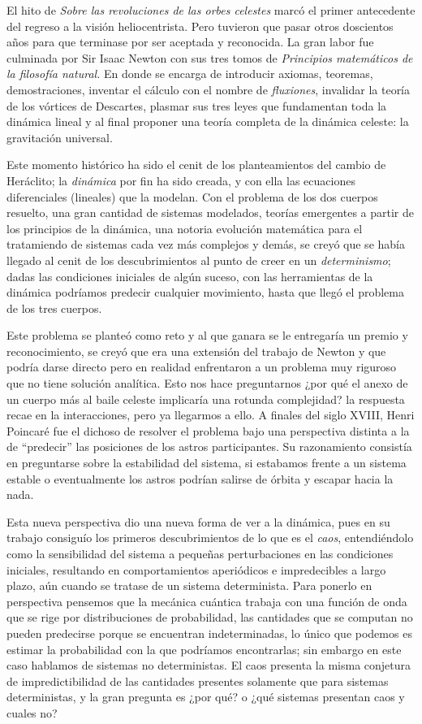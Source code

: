 \documentclass[11pt,a4paper]{article}
\begin{document}
El hito de \emph{Sobre las revoluciones de las orbes celestes} marcó el primer antecedente del regreso a la visión heliocentrista. Pero tuvieron que pasar otros doscientos años para que terminase por ser aceptada y reconocida. La gran labor fue culminada por Sir Isaac Newton con sus tres tomos de \emph{Principios matemáticos de la filosofía natural.} En donde se encarga de introducir axiomas, teoremas, demostraciones, inventar el cálculo con el nombre de \emph{fluxiones}, invalidar la teoría de los vórtices de Descartes, plasmar sus tres leyes que fundamentan toda la dinámica lineal y al final proponer una teoría completa de la dinámica celeste: la gravitación universal. 

Este momento histórico ha sido el cenit de los planteamientos del cambio de Heráclito; la \emph{dinámica} por fin ha sido creada, y con ella las ecuaciones diferenciales (lineales) que la modelan. Con el problema de los dos cuerpos resuelto, una gran cantidad de sistemas modelados, teorías emergentes a partir de los principios de la dinámica, una notoria evolución matemática para el tratamiendo de sistemas cada vez más complejos y demás, se creyó que se había llegado al cenit de los descubrimientos al punto de creer en un \emph{determinismo}; dadas las condiciones iniciales de algún suceso, con las herramientas de la dinámica podríamos predecir cualquier movimiento, hasta que llegó el problema de los tres cuerpos.

Este problema se planteó como reto y al que ganara se le entregaría un premio y reconocimiento, se creyó que era una extensión del trabajo de Newton y que podría darse directo pero en realidad enfrentaron a un problema muy riguroso que no tiene solución analítica. Esto nos hace preguntarnos ¿por qué el anexo de un cuerpo más al baile celeste implicaría una rotunda complejidad? la respuesta recae en la interacciones, pero ya llegarmos a ello. A finales del siglo XVIII, Henri Poincaré fue el dichoso de resolver el problema bajo una perspectiva distinta a la de “predecir'' las posiciones de los astros participantes. Su razonamiento consistía en preguntarse sobre la estabilidad del sistema, si estabamos frente a un sistema estable o eventualmente los astros podrían salirse de órbita y escapar hacia la nada.

Esta nueva perspectiva dio una nueva forma de ver a la dinámica, pues en su trabajo consiguío los primeros descubrimientos de lo que es el \emph{caos}, entendiéndolo como la sensibilidad del sistema a pequeñas perturbaciones en las condiciones iniciales, resultando en comportamientos aperiódicos e impredecibles a largo plazo, aún cuando se tratase de un sistema determinista. Para ponerlo en perspectiva pensemos que la mecánica cuántica trabaja con una función de onda que se rige por distribuciones de probabilidad, las cantidades que se computan no pueden predecirse porque se encuentran indeterminadas, lo único que podemos es estimar la probabilidad con la que podríamos encontrarlas; sin embargo en este caso hablamos de sistemas no deterministas. El caos presenta la misma conjetura de impredictibilidad de las cantidades presentes solamente que para sistemas deterministas, y la gran pregunta es ¿por qué? o ¿qué sistemas presentan caos y cuales no?
\end{document}
